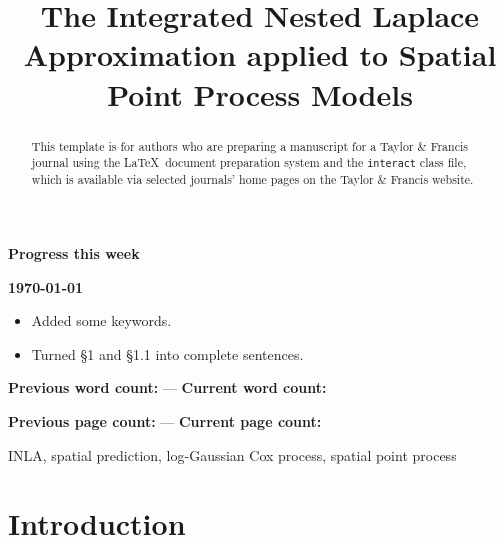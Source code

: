 \documentclass[]{interact}
\begin{document}
{\Large\bf Progress this week}

{\large\bf\today}

\begin{itemize}

\item Added some keywords.

\item Turned \S 1 and \S 1.1 into complete sentences.

\end{itemize}

\vfill

\textbf{Previous word count:} --- \hfill \textbf{Current word count:}

\textbf{Previous page count:} --- \hfill \textbf{Current page count:}

\pagebreak


\title{The Integrated Nested Laplace Approximation applied to Spatial Point Process Models}

\author{
}

\maketitle

\begin{abstract}
This template is for authors who are preparing a manuscript for a Taylor \& Francis journal using the \LaTeX\ document preparation system and the \texttt{interact} class file, which is available via selected journals' home pages on the Taylor \& Francis website.
\end{abstract}

\begin{keywords}
INLA, spatial prediction, log-Gaussian Cox process, spatial point process
\end{keywords}


\section{Introduction}
\end{document}
